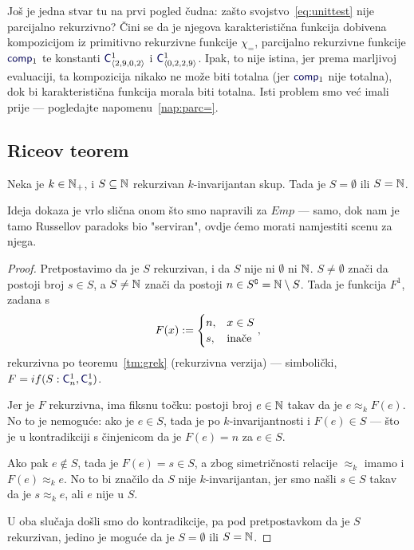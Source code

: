 Još je jedna stvar tu na prvi pogled čudna: zašto svojstvo~\eqref{eq:unittest} nije parcijalno rekurzivno? Čini se da je njegova karakteristična funkcija dobivena kompozicijom iz primitivno rekurzivne funkcije $\chi_=$, parcijalno rekurzivne funkcije $\f{comp}_1$ te konstanti $\f C^1_{\kr{2,9,0,2}}$ i $\f C^1_{\kr{0,2,2,9}}$. Ipak, to nije istina, jer prema marljivoj evaluaciji, ta kompozicija nikako ne može biti totalna (jer $\f{comp}_1$ nije totalna), dok bi karakteristična funkcija morala biti totalna. Isti problem smo već imali prije --- pogledajte napomenu~\ref{nap:parc=}.

\subsection{Riceov teorem}

\begin{teorem}\label{tm:Rice}
Neka je $k\in{\mathbb N}_+$, i $S\subseteq{\mathbb N}$ rekurzivan $k$-invarijantan skup. Tada je $S=\emptyset$ ili $S={\mathbb N}$.
\end{teorem}

Ideja dokaza je vrlo slična onom što smo napravili za $Emp$ --- samo, dok nam je tamo Russellov paradoks bio "serviran"\!, ovdje ćemo morati namjestiti scenu za njega.

\begin{proof}
Pretpostavimo da je $S$ rekurzivan, i da $S$ nije ni $\emptyset$ ni ${\mathbb N}$. $S\ne\emptyset$ znači da postoji broj $s\in S$, a $S\ne{\mathbb N}$ znači da postoji $n\in S\sp{{\scriptscriptstyle\complement}}={\mathbb N}\setminus S$. Tada je funkcija $F^1$, zadana s
\begin{equation}
    F(x):=\begin{cases}
        n,&x\in S\\
        s,&\text{inače}
    \end{cases}\text,
\end{equation}
    rekurzivna po teoremu~\ref{tm:grek} (rekurzivna verzija) --- simbolički, $F=\IF{S:\f C_n^1,\f C_s^1}$.

Jer je $F$ rekurzivna, ima fiksnu točku: postoji broj $e\in{\mathbb N}$ takav da je $e\approx_k F(e)$. No to je nemoguće: ako je $e\in S$, tada je po $k$-invarijantnosti i $F(e)\in S$ --- što je u kontradikciji s činjenicom da je $F(e)=n$ za $e\in S$.

Ako pak $e\notin S$, tada je $F(e)=s\in S$, a zbog simetričnosti relacije $\approx_k$ imamo i $F(e)\approx_k e$. No to bi značilo da $S$ nije $k$-invarijantan, jer smo našli $s\in S$ takav da je $s\approx_k e$, ali $e$ nije u $S$.

U oba slučaja došli smo do kontradikcije, pa pod pretpostavkom da je $S$ rekurzivan, jedino je moguće da je $S=\emptyset$ ili $S={\mathbb N}$.
\end{proof}

